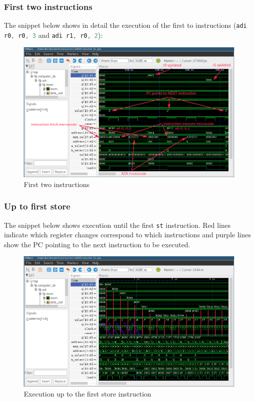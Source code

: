 \documentclass[a4paper]{article}
\numberwithin{figure}{section}
\numberwithin{table}{section}
\newcommand{\mi}{\mintinline}
\begin{document}
\subsubsection{First two instructions}
The snippet below shows in detail the execution of the first to instructions (\mi{c}{adi r0, r0, 3} and 
\mi{c}{adi r1, r0, 2}):
\begin{figure}[h!]
	\centering
	\includegraphics[width=\textwidth]{first_two}
	\caption{First two instructions}
\end{figure}

\newpage
\subsubsection{Up to first store}
The snippet below shows execution until the first \mi{c}{st} instruction. Red lines indicate which register 
changes correspond to which instructions and purple lines show the PC pointing to the next instruction to be 
executed.
\begin{figure}[h!]
	\centering
	\includegraphics[width=\textwidth]{until_store}
	\caption{Execution up to the first store instruction}
\end{figure}
\end{document}
